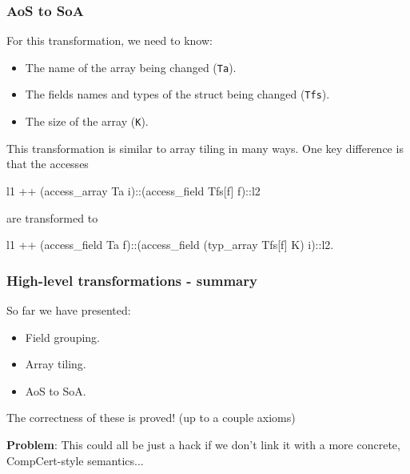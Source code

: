 \begin{frame}[fragile]
\frametitle{AoS to SoA}

For this transformation, we need to know:
\begin{itemize}
	\item The name of the array being changed (\texttt{Ta}).
	\item The fields names and types of the struct being changed (\texttt{Tfs}).
	\item The size of the array (\texttt{K}).
\end{itemize}
 
\bigskip \pause
 
This transformation is similar to array tiling in many ways. One key difference is that the accesses
 
\begin{coqs}
  l1 ++ (access_array Ta i)::(access_field Tfs[f] f)::l2
\end{coqs}

are transformed to

\begin{coqs}
  l1 ++ (access_field Ta f)::(access_field (typ_array Tfs[f] K) i)::l2.
\end{coqs}
 
\end{frame}


\begin{frame}[fragile]
\frametitle{High-level transformations - summary}

So far we have presented:

\begin{itemize}
	\setlength\itemsep{1.5em}
	\item Field grouping.
	\item Array tiling.
	\item AoS to SoA.
\end{itemize}

\bigskip \pause

The correctness of these is proved! \pause (up to a couple axioms)

\bigskip \pause

\textbf{Problem}: This could all be just a hack if we don't link it with a more concrete, CompCert-style semantics...

\end{frame}


